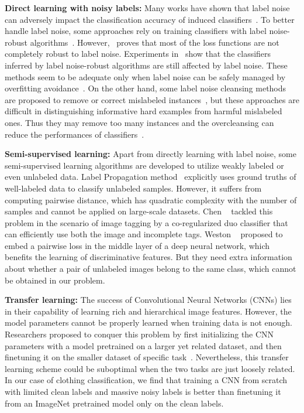 \documentclass[10pt,twocolumn,letterpaper]{article}
\begin{document}
{\bf Direct learning with noisy labels:} Many works have shown that label noise can adversely impact the classification accuracy of induced classifiers~\cite{zhu2004class}. To better handle label noise, some approaches rely on training classifiers with label noise-robust algorithms~\cite{beigman2009learning,manwani2013noise}. However,~\cite{bartlett2006convexity} proves that most of the loss functions are not completely robust to label noise. Experiments in~\cite{teng2001comparison} show that the classifiers inferred by label noise-robust algorithms are still affected by label noise. These methods seem to be adequate only when label noise can be safely managed by overfitting avoidance~\cite{frenay2013classification}. On the other hand, some label noise cleansing methods are proposed to remove or correct mislabeled instances~\cite{barandela2000decontamination,brodley2011identifying,miranda2009use}, but these approaches are difficult in distinguishing informative hard examples from harmful mislabeled ones. Thus they may remove too many instances and the overcleansing can reduce the performances of classifiers~\cite{matic1992computer}.

{\bf Semi-supervised learning:} Apart from directly learning with label noise, some semi-supervised learning algorithms are developed to utilize weakly labeled or even unlabeled data. Label Propagation method~\cite{zhu2002learning} explicitly uses ground truths of well-labeled data to classify unlabeled samples. However, it suffers from computing pairwise distance, which has quadratic complexity with the number of samples and cannot be applied on large-scale datasets. Chen \etal~\cite{chen2013fast} tackled this problem in the scenario of image tagging by a co-regularized duo classifier that can efficiently use both the image and incomplete tags. Weston \etal~\cite{weston2012deep} proposed to embed a pairwise loss in the middle layer of a deep neural network, which benefits the learning of discriminative features. But they need extra information about whether a pair of unlabeled images belong to the same class, which cannot be obtained in our problem.

{\bf Transfer learning:} The success of Convolutional Neural Networks (CNNs) lies in their capability of learning rich and hierarchical image features. However, the model parameters cannot be properly learned when training data is not enough. Researchers proposed to conquer this problem by first initializing the CNN parameters with a model pretrained on a larger yet related dataset, and then finetuning it on the smaller dataset of specific task~\cite{krizhevsky2012imagenet, oquab2013learning, azizpour2014generic,donahue2013decaf}. Nevertheless, this transfer learning scheme could be suboptimal when the two tasks are just loosely related. In our case of clothing classification, we find that training a CNN from scratch with limited clean labels and massive noisy labels is better than finetuning it from an ImageNet pretrained model only on the clean labels.
\end{document}
